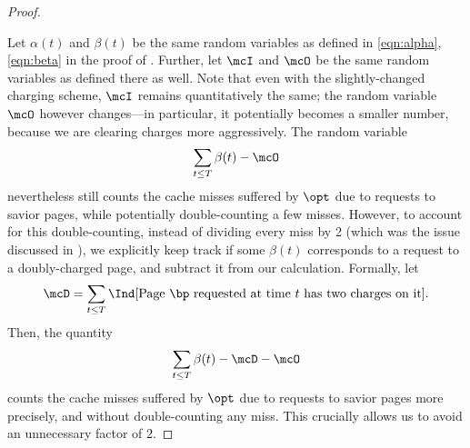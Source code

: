 \documentclass[11pt]{article}
\begin{document}
\begin{proof}
\begin{figure}[H]
    \end{figure}
    Let $\alpha(t)$ and $\beta(t)$ be the same random variables as defined in \eqref{eqn:alpha}, \eqref{eqn:beta} in the proof of . Further, let $\mcI$ and $\mcO$ be the same random variables as defined there as well. Note that even with the slightly-changed charging scheme, $\mcI$ remains quantitatively the same; the random variable $\mcO$ however changes---in particular, it potentially becomes a smaller number, because we are clearing charges more aggressively. The random variable
    \begin{align*}
        \sum_{t \le T}\beta(t) - \mcO
    \end{align*}
    nevertheless still counts the cache misses suffered by $\opt$ due to requests to savior pages, while potentially double-counting a few misses. However, to account for this double-counting, instead of dividing every miss by 2 (which was the issue discussed in ), we explicitly keep track if some $\beta(t)$ corresponds to a request to a doubly-charged page, and subtract it from our calculation. Formally, let
    \begin{align}
        \mcD = \sum_{t \le T}\Ind[\text{Page $\bp$ requested at time $t$ has two charges on it}]. \label{eqn:D}
    \end{align}
    Then, the quantity
    \begin{align*}
        \sum_{t \le T}\beta(t) - \mcD - \mcO
    \end{align*}
    counts the cache misses suffered by $\opt$ due to requests to savior pages more precisely, and without double-counting any miss. This crucially allows us to avoid an unnecessary factor of $2$.


\end{proof}
\end{document}
